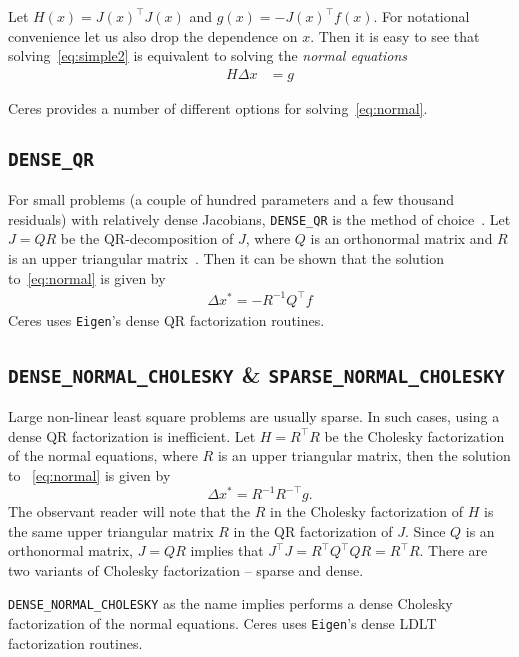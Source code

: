 Let $H(x)= J(x)^\top J(x)$ and $g(x) = -J(x)^\top  f(x)$. For notational convenience let us also drop the dependence on $x$. Then it is easy to see that solving~\eqref{eq:simple2} is equivalent to solving the {\em normal equations}
\begin{align}
H \Delta x  &= g \label{eq:normal}
\end{align}

Ceres provides a number of different options for solving~\eqref{eq:normal}.

\subsection{\texttt{DENSE\_QR}}
For small problems (a couple of hundred parameters and a few thousand residuals) with relatively dense Jacobians, \texttt{DENSE\_QR} is the method of choice~\cite{bjorck1996numerical}. Let $J = QR$ be the QR-decomposition of $J$, where $Q$ is an orthonormal matrix and $R$ is an upper triangular matrix~\cite{trefethen1997numerical}. Then it can be shown that the solution to~\eqref{eq:normal} is given by
\begin{align}
    \Delta x^* = -R^{-1}Q^\top f
\end{align}
Ceres uses \texttt{Eigen}'s dense QR factorization routines.

\subsection{\texttt{DENSE\_NORMAL\_CHOLESKY} \& \texttt{SPARSE\_NORMAL\_CHOLESKY}}
Large non-linear least square problems are usually sparse. In such cases, using a dense QR factorization is inefficient. Let $H = R^\top R$ be the Cholesky factorization of the normal equations, where $R$ is an upper triangular matrix, then the  solution to ~\eqref{eq:normal} is given by
\begin{equation}
    \Delta x^* = R^{-1} R^{-\top} g.
\end{equation}
The observant reader will note that the $R$ in the Cholesky
factorization of $H$ is the same upper triangular matrix $R$ in the QR
factorization of $J$. Since $Q$ is an orthonormal matrix, $J=QR$
implies that $J^\top J = R^\top Q^\top Q R = R^\top R$. There are two variants of Cholesky factorization -- sparse and
dense.

\texttt{DENSE\_NORMAL\_CHOLESKY}  as the name implies performs a dense
Cholesky factorization of the normal equations. Ceres uses
\texttt{Eigen}'s dense LDLT factorization routines.

